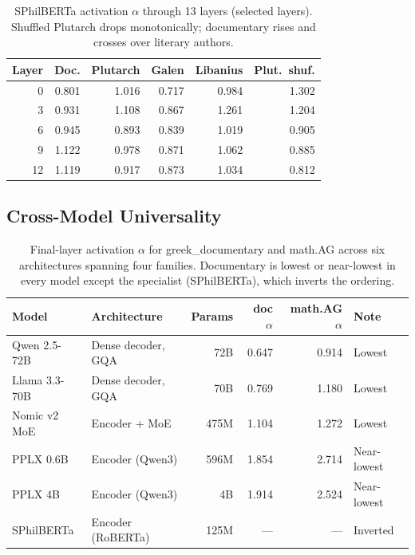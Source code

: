 \documentclass[12pt,letterpaper]{article}
\newcommand{\al}{\alpha}
\begin{document}
\begin{table}[H]
\centering
\caption{SPhilBERTa activation $\al$ through 13 layers
(selected layers).  Shuffled Plutarch drops monotonically;
documentary rises and crosses over literary authors.}
\label{tab:sphilberta}
\begin{tabular}{rrrrrr}
\toprule
\textbf{Layer} & \textbf{Doc.} & \textbf{Plutarch} &
\textbf{Galen} & \textbf{Libanius} & \textbf{Plut.\ shuf.} \\
\midrule
0 & 0.801 & 1.016 & 0.717 & 0.984 & 1.302 \\
3 & 0.931 & 1.108 & 0.867 & 1.261 & 1.204 \\
6 & 0.945 & 0.893 & 0.839 & 1.019 & 0.905 \\
9 & 1.122 & 0.978 & 0.871 & 1.062 & 0.885 \\
12 & 1.119 & 0.917 & 0.873 & 1.034 & 0.812 \\
\bottomrule
\end{tabular}
\end{table}

\subsection{Cross-Model Universality}
\label{sec:crossmodel}

\begin{table}[H]
\centering
\caption{Final-layer activation $\al$ for greek\_documentary and
math.AG across six architectures spanning four families.
Documentary is lowest or near-lowest in every model except the
specialist (SPhilBERTa), which inverts the ordering.}
\label{tab:crossmodel}
\begin{tabular}{llrrrl}
\toprule
\textbf{Model} & \textbf{Architecture} & \textbf{Params} &
\textbf{doc $\al$} & \textbf{math.AG $\al$} & \textbf{Note} \\
\midrule
Qwen 2.5-72B & Dense decoder, GQA & 72B & 0.647 & 0.914 & Lowest \\
Llama 3.3-70B & Dense decoder, GQA & 70B & 0.769 & 1.180 & Lowest \\
Nomic v2 MoE & Encoder + MoE & 475M & 1.104 & 1.272 & Lowest \\
PPLX 0.6B & Encoder (Qwen3) & 596M & 1.854 & 2.714 & Near-lowest \\
PPLX 4B & Encoder (Qwen3) & 4B & 1.914 & 2.524 & Near-lowest \\
SPhilBERTa & Encoder (RoBERTa) & 125M & --- & --- & Inverted \\
\bottomrule
\end{tabular}
\end{table}
\end{document}
